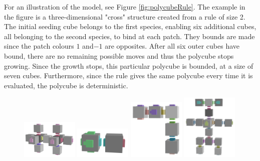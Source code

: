 For an illustration of the model, see Figure \ref{fig:polycubeRule}. The example in the figure is a three-dimensional "cross" structure created from a rule of size 2. The initial seeding cube belongs to the first species, enabling six additional cubes, all belonging to the second species, to bind at each patch. They bounds are made since the patch colours \(1\) and\( -1\) are opposites. After all six outer cubes have bound, there are no remaining possible moves and thus the polycube stops growing. Since the growth stops, this particular polycube is bounded, at a size of seven cubes. Furthermore, since the rule gives the same polycube every time it is evaluated, the polycube is deterministic.

\begin{figure}
    \centering\includegraphics[align=c,width=0.24\textwidth]{figures/dnaRoboticPolycubes/doubleplus.png}\hfill
    \centering\includegraphics[align=c,width=0.24\textwidth]{figures/dnaRoboticPolycubes/swimmer.png}\hfill
    \centering\includegraphics[align=c,width=0.24\textwidth]{figures/dnaRoboticPolycubes/L.png}\hfill
    \centering\includegraphics[align=c,width=0.24\textwidth]{figures/dnaRoboticPolycubes/robot.png}

\end{figure}
